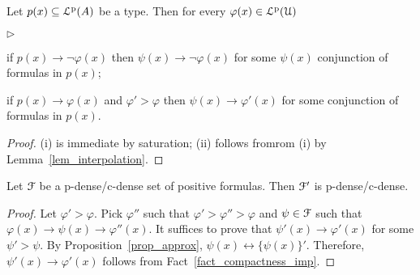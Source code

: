 \documentclass[10pt,oneside]{amsproc}
\newcommand{\mylabel}[1]{{#1}\hfill}
\renewenvironment{itemize}
  {\begin{list}{$\triangleright$}{%
  \setlength{\parskip}{0mm}
  \setlength{\topsep}{.4\baselineskip}
  \setlength{\rightmargin}{0mm}
  \setlength{\listparindent}{0mm}
  \setlength{\itemindent}{0mm}
  \setlength{\labelwidth}{3ex}
  \setlength{\itemsep}{.2\baselineskip}
  \setlength{\parsep}{.2\baselineskip}
  \setlength{\partopsep}{0mm}
  \setlength{\labelsep}{1ex}
  \setlength{\leftmargin}{\labelwidth+\labelsep}
  \let\makelabel\mylabel}}{%
\end{list}}
\begin{document}
{\begin{fact}\label{fact_compactness_imp}
  Let $p(x)\subseteq{\EuScript L}^{\rm p}(A)$ be a type.
  Then for every  $\varphi(x)\in{\EuScript L}^{\rm p}({\EuScript U})$
  \begin{itemize}
    \item[i.] if $p(x)\rightarrow\neg\varphi(x)$ then $\psi(x)\rightarrow\neg\varphi(x)$ for some $\psi(x)$ conjunction of formulas in $p(x)$;
    \item[ii.] if $p(x)\rightarrow\varphi(x)$ and $\varphi'>\varphi$ then $\psi(x)\rightarrow\varphi'(x)$ for some conjunction of formulas in $p(x)$.
  \end{itemize} 
\end{fact}

\begin{proof}
  (i) is immediate by saturation; (ii) follows fromrom (i) by Lemma~\ref{lem_interpolation}.
\end{proof}

\begin{fact}\label{fact_Fdense}
  Let ${\EuScript F}$ be a p-dense/c-dense set of positive formulas.
  Then ${\EuScript F}'$ is p-dense/c-dense.
\end{fact}

\begin{proof}
  Let $\varphi'>\varphi$.
  Pick $\varphi''$ such that $\varphi'>\varphi''>\varphi$ and $\psi\in{\EuScript F}$ such that $\varphi(x)\rightarrow\psi(x)\rightarrow\varphi''(x)$.
  It suffices to prove that $\psi'(x)\rightarrow\varphi'(x)$ for some $\psi'>\psi$.
  By Proposition~\ref{prop_approx}, $\psi(x)\leftrightarrow\{\psi(x)\}'$.
  Therefore, $\psi'(x)\rightarrow\varphi'(x)$ follows from Fact~\ref{fact_compactness_imp}.
\end{proof}

  



}
\end{document}

